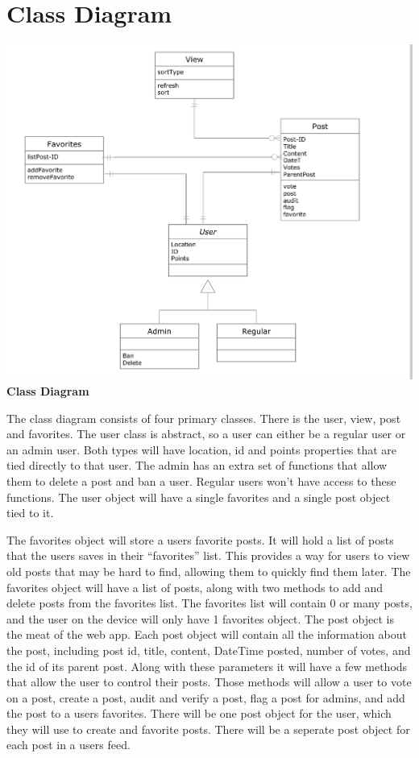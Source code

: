 \documentclass[12pt]{article}
\begin{document}
\section{Class Diagram}
\begin{center}
\includegraphics[scale=0.25]{img/uml/ClassDiagram}\linebreak
\textbf{Class Diagram}
  \end{center}

The class diagram consists of four primary classes.  There is the user, view, post and favorites.  The user class is abstract, so a user can either be a regular user or an admin user.  Both types will have location, id and points properties that are tied directly to that user.  The admin has an extra set of functions that allow them to delete a post and ban a user.  Regular users won’t have access to these functions.  The user object will have a single favorites and a single post object tied to it.\newline

The favorites object will store a users favorite posts.  It will hold a list of posts that the users saves in their “favorites” list.  This provides a way for users to view old posts that may be hard to find, allowing them to quickly find them later.  The favorites object will have a list of posts, along with two methods to add and delete posts from the favorites list.  The favorites list will contain 0 or many posts, and the user on the device will only have 1 favorites object.
The post object is the meat of the web app.  Each post object will contain all the information about the post, including post id, title, content, DateTime posted, number of votes, and the id of its parent post.  Along with these parameters it will have a few methods that allow the user to control their posts.  Those methods will allow a user to vote on a post, create a post, audit and verify a post, flag a post for admins, and add the post to a users favorites.  There will be one post object for the user, which they will use to create and favorite posts.  There will be a seperate post object for each post in a users feed.\newline
\end{document}
